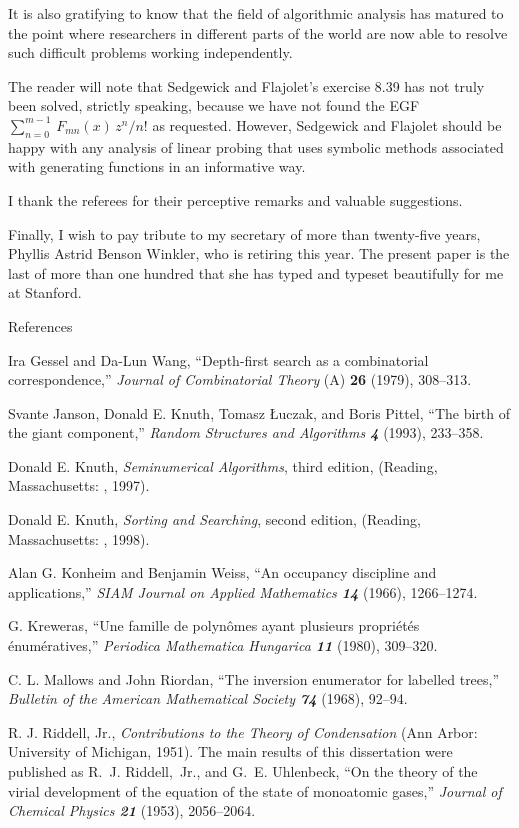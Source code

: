 It is also gratifying to know that the field of algorithmic analysis has
matured to the point where researchers in different parts of the world are
now able to resolve such difficult problems working independently.

The reader will note that Sedgewick and Flajolet's exercise 8.39 has not
truly been solved, strictly speaking, because we have not found the EGF
$\sum_{n=0}^{m-1}\,F_{mn}(x)\,z^n\!/n!$ as requested. However, Sedgewick
and Flajolet should be happy with any analysis of linear probing that uses
symbolic methods associated with generating functions in an informative
way.

I thank the referees for their perceptive remarks and valuable suggestions.

Finally, I wish to pay tribute to my secretary of more than twenty-five
years, Phyllis Astrid Benson Winkler, who is retiring this year. The
present paper is the last of more than one hundred that she has typed and
typeset beautifully for me at Stanford.

\bigskip
\centerline{References}

\smallskip
\bib
[\GW]
Ira Gessel and Da-Lun Wang, ``Depth-first search as a combinatorial
correspondence,'' {\sl Journal of Combinatorial Theory\/} (A) {\bf 26}
(1979), 308--313.

\smallskip
\bib
[\JKLP]
Svante Janson, Donald E. Knuth, Tomasz {\L}uczak, and Boris Pittel, ``The
birth of the giant component,'' {\sl Random Structures and Algorithms\/ \bf
4} (1993), 233--358.

\smallskip
\bib
[\Kii]
Donald E. Knuth, {\sl Seminumerical Algorithms}, third edition,
(Reading, Massachusetts: \AW, 1997).

\smallskip
\bib
[\Kiii] Donald E. Knuth, {\sl Sorting and Searching}, second edition,
(Reading, Massachusetts: \AW, 1998).

\smallskip
\bib
[\KW]
Alan G. Konheim and Benjamin Weiss, ``An occupancy discipline and
applications,'' {\sl SIAM Journal on Applied Mathematics\/ \bf 14} (1966),
1266--1274.

\smallskip
\bib
[\Kr]
G. Kreweras, ``Une famille de polyn\^omes ayant plusieurs propri\'et\'es
\'enum\'eratives,'' {\sl Periodica Mathematica Hungarica\/ \bf 11}
 (1980), 309--320.

\smallskip
\bib
[\MR]
C. L. Mallows and John Riordan, ``The inversion enumerator for labelled
trees,'' {\sl Bulletin of the American Mathematical Society\/ \bf 74}
(1968), 92--94.

\smallskip
\bib
[\R]
R. J. Riddell, Jr., {\sl Contributions to the Theory of Condensation\/}
(Ann Arbor: University of Michigan, 1951). The main results of this
dissertation were published as R.~J. Riddell,~Jr., and G.~E. Uhlenbeck,
``On the theory of the virial development of the equation of the state of
monoatomic gases,'' {\sl Journal of Chemical Physics\/ \bf 21} (1953),
2056--2064.

